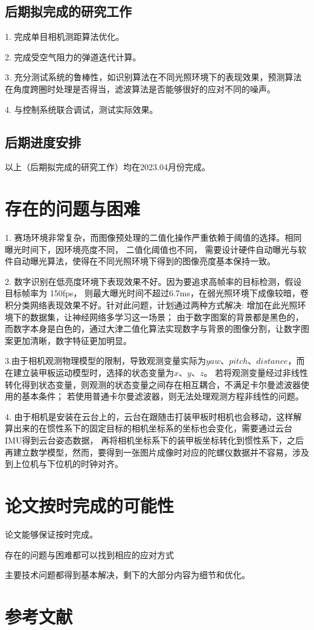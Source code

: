 \subsection{后期拟完成的研究工作}
1. 完成单目相机测距算法优化。\par
2. 完成受空气阻力的弹道迭代计算。\par
3. 充分测试系统的鲁棒性，如识别算法在不同光照环境下的表现效果，预测算法在角度跨圈时处理是否得当，滤波算法是否能够很好的应对不同的噪声。\par
4. 与控制系统联合调试，测试实际效果。\par
\subsection{后期进度安排}
以上（后期拟完成的研究工作）均在2023.04月份完成。
\section{存在的问题与困难}
1. 赛场环境非常复杂，而图像预处理的二值化操作严重依赖于阈值的选择。相同曝光时间下，因环境亮度不同， 二值化阈值也不同，
需要设计硬件自动曝光与软件自动曝光算法，使得在不同光照环境下得到的图像亮度基本保持一致。\par
2. 数字识别在低亮度环境下表现效果不好。因为要追求高帧率的目标检测，假设目标帧率为 150fps，
则最大曝光时间不超过6.7ms，在弱光照环境下成像较暗，卷积分类网络表现效果不好。针对此问题，计划通过两种方式解决:
增加在此光照环境下的数据集，让神经网络多学习这一场景；
由于数字图案的背景都是黑色的，而数字本身是白色的，通过大津二值化\cite{otsu1979threshold}算法实现数字与背景的图像分割，让数字图案更加清晰，数字特征更加明显。\par
3.由于相机观测物理模型的限制，导致观测变量实际为$yaw$、$pitch$、$distance$，而在建立装甲板运动模型时，选择的状态变量为$x$、$y$、$z$。
若将观测变量经过非线性转化得到状态变量，则观测的状态变量之间存在相互耦合，不满足卡尔曼滤波器使用的基本条件；
若使用普通卡尔曼滤波器，则无法处理观测方程非线性的问题。\par
4. 由于相机是安装在云台上的，云台在跟随击打装甲板时相机也会移动，这样解算出来的在惯性系下的固定目标的相机坐标系的坐标也会变化，需要通过云台IMU得到云台姿态数据，
再将相机坐标系下的装甲板坐标转化到惯性系下，之后再建立数学模型，然而，要得到一张图片成像时对应的陀螺仪数据并不容易，涉及到上位机与下位机的时钟对齐。
\section{论文按时完成的可能性}
论文能够保证按时完成。\par
存在的问题与困难都可以找到相应的应对方式\par
主要技术问题都得到基本解决，剩下的大部分内容为细节和优化。\par

\section{参考文献}




